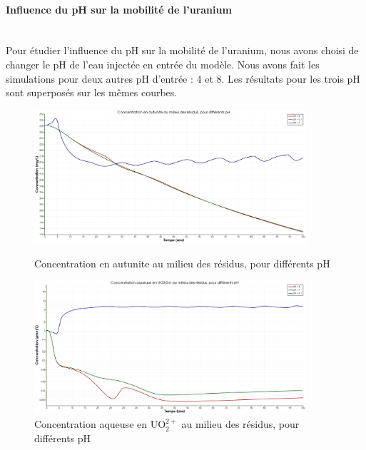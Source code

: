 \documentclass{article}
\begin{document}
\paragraph{Influence du pH sur la mobilité de l'uranium \\ \\}
Pour étudier l’influence du pH sur la mobilité de l’uranium, nous avons choisi de changer le pH de l’eau injectée en entrée du modèle. Nous avons fait les simulations pour deux autres pH d’entrée : 4 et 8. Les résultats pour les trois pH sont superposés sur les mêmes courbes.

\begin{figure}[H]
    \centering
    \begin{minipage}{0.5\textwidth}
        \centering
        \includegraphics[width=0.9\textwidth]{III_B_2_9.png} 
        \caption{Concentration en autunite au milieu des résidus, pour différents pH}
        \label{fig:autunite_residus_comparaison}
    \end{minipage}\hfill
    \begin{minipage}{0.5\textwidth}
        \centering
        \includegraphics[width=0.9\textwidth]{III_B_2_10.png} 
        \caption{Concentration aqueuse en UO$_2^{2+}$ au milieu des résidus, pour différents pH}
        \label{fig:UO2_residus_comparaison}
    \end{minipage}
\end{figure}
\end{document}
